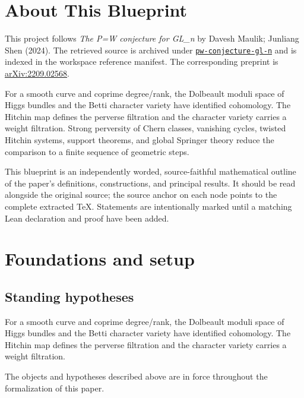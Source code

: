 

\chapter*{About This Blueprint}
\label{pw-conjecture-gl-n-about}

This project follows \emph{The P=W conjecture for GL_n} by Davesh Maulik; Junliang Shen (2024). The
retrieved source is archived under
\href{../../../../../references/pw-conjecture-gl-n/}{\texttt{pw-conjecture-gl-n}} and is indexed in
the workspace reference manifest. The corresponding preprint is
\href{https://arxiv.org/abs/2209.02568}{arXiv:2209.02568}.

For a smooth curve and coprime degree/rank, the Dolbeault moduli space of Higgs bundles and the Betti character variety have identified cohomology. The Hitchin map defines the perverse filtration and the character variety carries a weight filtration. Strong perversity of Chern classes, vanishing cycles, twisted Hitchin systems, support theorems, and global Springer theory reduce the comparison to a finite sequence of geometric steps.

This blueprint is an independently worded, source-faithful mathematical
outline of the paper's definitions, constructions, and principal results. It
should be read alongside the original source; the source anchor on each node
points to the complete extracted TeX. Statements are intentionally marked
\notready until a matching Lean declaration and proof have been added.

\chapter{Foundations and setup}
\label{chap:pw-conjecture-gl-n-foundations}

\section{Standing hypotheses}
\label{sec:pw-conjecture-gl-n-standing}

For a smooth curve and coprime degree/rank, the Dolbeault moduli space of Higgs bundles and the Betti character variety have identified cohomology. The Hitchin map defines the perverse filtration and the character variety carries a weight filtration.

\begin{convention}
\label{pw-conjecture-gl-n-setup}
The objects and hypotheses described above are in force throughout the
formalization of this paper.
\notready
\end{convention}

